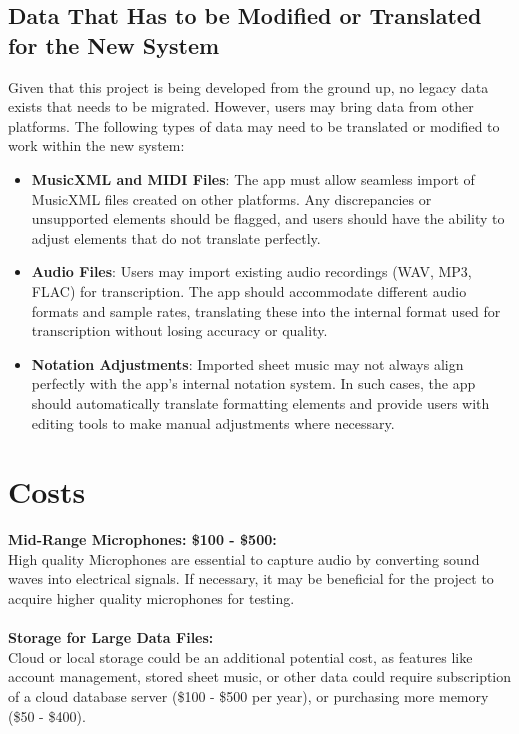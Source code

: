\documentclass[12pt]{article}
\begin{document}
\subsection{Data That Has to be Modified or Translated for the New System}
Given that this project is being developed from the ground up, no legacy data exists that needs to be migrated. However, users may bring data from other platforms. The following types of data may need to be translated or modified to work within the new system:
\begin{itemize}
    \item \textbf{MusicXML and MIDI Files}: The app must allow seamless import of MusicXML files created on other platforms. Any discrepancies or unsupported elements should be flagged, and users should have the ability to adjust elements that do not translate perfectly.
    
    \item \textbf{Audio Files}: Users may import existing audio recordings (WAV, MP3, FLAC) for transcription. The app should accommodate different audio formats and sample rates, translating these into the internal format used for transcription without losing accuracy or quality.
    
    \item \textbf{Notation Adjustments}: Imported sheet music may not always align perfectly with the app’s internal notation system. In such cases, the app should automatically translate formatting elements and provide users with editing tools to make manual adjustments where necessary.
\end{itemize}

\section{Costs}
\textbf{Mid-Range Microphones: \$100 - \$500:} \\
High quality Microphones are essential to capture audio by converting sound waves into electrical signals. If necessary, it may be beneficial for the project to acquire higher quality microphones for testing. \\ \\
\textbf{Storage for Large Data Files:} \\
Cloud or local storage could be an additional potential cost, as features like account management, stored sheet music, or other data could require subscription of a cloud database server (\$100 - \$500 per year), or purchasing more memory (\$50 - \$400).
\end{document}
